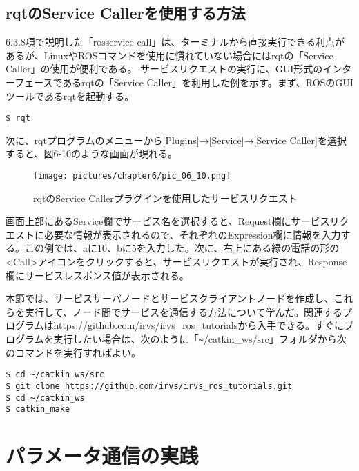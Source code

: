 \subsection{rqtのService Callerを使用する方法}

6.3.8項で説明した「rosservice call」は、ターミナルから直接実行できる利点があるが、LinuxやROSコマンドを使用に慣れていない場合にはrqtの「Service Caller」の使用が便利である。
サービスリクエストの実行に、GUI形式のインターフェースであるrqtの「Service Caller」を利用した例を示す。まず、ROSのGUIツールであるrqtを起動する。

\begin{lstlisting}[language=ROS]
$ rqt
\end{lstlisting}

次に、rqtプログラムのメニューから[Plugins]→[Service]→[Service Caller]を選択すると、図6-10のような画面が現れる。

\begin{figure}[h]
  \centering
  \texttt{[image: pictures/chapter6/pic\_06\_10.png]}
  \caption{rqtのService Callerプラグインを使用したサービスリクエスト}
\end{figure}

画面上部にあるService欄でサービス名を選択すると、Request欄にサービスリクエストに必要な情報が表示されるので、それぞれのExpression欄に情報を入力する。この例では、aに10、bに5を入力した。次に、右上にある緑の電話の形の<Call>アイコンをクリックすると、サービスリクエストが実行され、Response欄にサービスレスポンス値が表示される。

本節では、サービスサーバノードとサービスクライアントノードを作成し、これらを実行して、ノード間でサービスを通信する方法について学んだ。関連するプログラムはhttps://github.com/irvs/irvs\_ros\_tutorialsから入手できる。すぐにプログラムを実行したい場合は、次のように「\verb|~|/catkin\_ws/src」フォルダから次のコマンドを実行すればよい。

\begin{lstlisting}[language=ROS]
$ cd ~/catkin_ws/src
$ git clone https://github.com/irvs/irvs_ros_tutorials.git
$ cd ~/catkin_ws
$ catkin_make
\end{lstlisting}

\section{パラメータ通信の実践}

